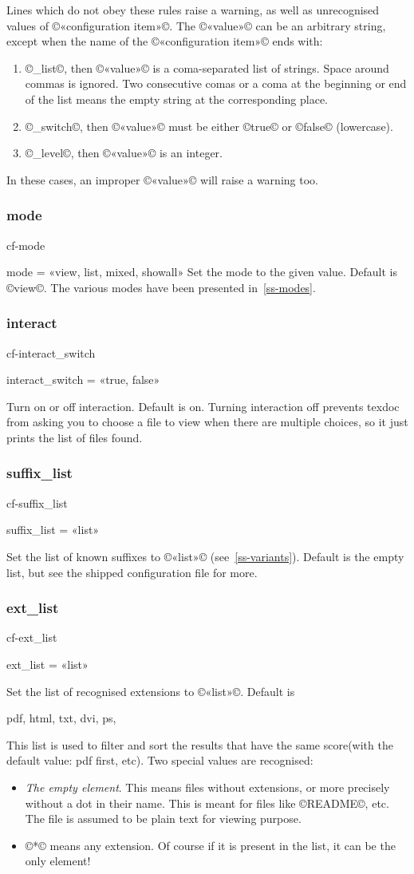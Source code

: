 \documentclass[a4paper, oneside]{scrartcl}
\makeatletter
\newif\ifframed
\newenvironment{cmdsubsub}[2]{%
  \framedfalse \commandes\subsubsection{#1}{#2}%
  }{%
  \endcommandes}
\newenvironment{htcode}{%
  \SaveVerbatim[samepage, gobble=2]{verbmat}%
  }{%
  \endSaveVerbatim
  \par\medskip\noindent\hspace*{\parindent}%
  \BUseVerbatim{verbmat}%
  \par\medskip\@endpetrue}
\makeatother
\begin{document}
Lines which do not obey these rules raise a warning, as well as unrecognised
values of ©«configuration item»©. The ©«value»© can be an arbitrary string,
except when the name of the ©«configuration item»© ends with:
\begin{enumerate}
  \item ©_list©, then ©«value»© is a coma-separated list of strings. Space
    around commas is ignored. Two consecutive comas or a coma at the beginning
    or end of the list means the empty string at the corresponding place.
  \item ©_switch©, then ©«value»© must be either ©true© or ©false©
    (lowercase).
  \item ©_level©, then ©«value»© is an integer.
\end{enumerate}
In these cases, an improper ©«value»© will raise a warning too.

\begin{cmdsubsub}{mode}{cf-mode}
  mode = «view, list, mixed, showall»
\end{cmdsubsub}
Set the  mode to the given value.  Default is ©view©. The various modes
have been presented in~\ref{ss-modes}.

\begin{cmdsubsub}{interact}{cf-interact_switch}
  interact_switch = «true, false»
\end{cmdsubsub}

Turn on or off interaction.  Default is on.  Turning interaction off prevents
texdoc from asking you to choose a file to view when there are multiple
choices, so it just prints the list of files found.

\begin{cmdsubsub}{suffix_list}{cf-suffix_list}
  suffix_list = «list»
\end{cmdsubsub}

Set the list of known suffixes to ©«list»© (see~\ref{ss-variants}). Default is
the empty list, but see the shipped configuration file for more.

\begin{cmdsubsub}{ext_list}{cf-ext_list}
  ext_list = «list»
\end{cmdsubsub}

Set the list of recognised extensions to ©«list»©.  Default is
\begin{htcode}
  pdf, html, txt, dvi, ps,
\end{htcode}
This list is used to filter and  sort the results that have the same
score(with the default value: pdf first, etc).  Two special values are
recognised:
\begin{itemize}
  \item \emph{The empty element}. This means files without extensions, or more
    precisely without a dot in their name.  This is meant for files like
    ©README©, etc.  The file is assumed to be plain text for viewing purpose.
  \item ©*© means any extension.  Of course if it is present in the list, it
    can be the only element!
\end{itemize}
\end{document}
